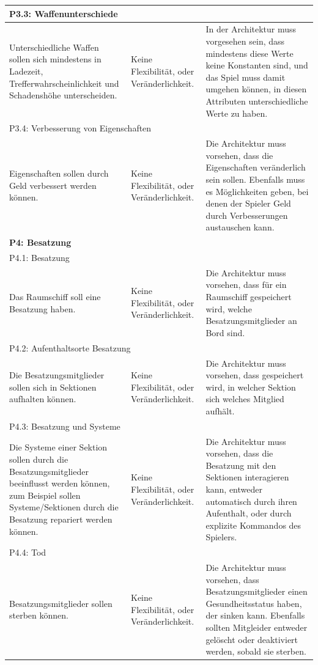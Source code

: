 \documentclass[fontsize=12pt,paper=a4,twoside]{scrartcl}
\begin{document}
\begin{longtable}[c]{|p{5cm}|p{5cm}|p{5cm}|}
\\ \hline
\multicolumn{3}{|l|}{{P3.3: Waffenunterschiede}} 
\\ \hline
Unterschiedliche Waffen sollen sich mindestens in Ladezeit, Trefferwahrscheinlichkeit und Schadenshöhe unterscheiden. & Keine Flexibilität, oder Veränderlichkeit.    &  In der Architektur muss vorgesehen sein, dass mindestens diese Werte keine Konstanten sind, und das Spiel muss damit umgehen können, in diesen Attributen unterschiedliche Werte zu haben. 
\\ \hline
\multicolumn{3}{|l|}{{P3.4: Verbesserung von Eigenschaften}} 
\\ \hline
Eigenschaften sollen durch Geld verbessert werden können. & Keine Flexibilität, oder Veränderlichkeit.    & Die Architektur muss vorsehen, dass die Eigenschaften veränderlich sein sollen. Ebenfalls muss es Möglichkeiten geben, bei denen der Spieler Geld durch Verbesserungen austauschen kann.  
\\ \hline
%
\multicolumn{3}{|l|}{{\textbf{P4: Besatzung}}} 
\\ \hline
\multicolumn{3}{|l|}{{P4.1: Besatzung}} 
\\ \hline
Das Raumschiff soll eine Besatzung haben. & Keine Flexibilität, oder Veränderlichkeit.    &  Die Architektur muss vorsehen, dass für ein Raumschiff gespeichert wird, welche Besatzungsmitglieder an Bord sind. 
\\ \hline  
\multicolumn{3}{|l|}{{P4.2: Aufenthaltsorte Besatzung}} 
\\ \hline
Die Besatzungsmitglieder sollen sich in Sektionen aufhalten können. & Keine Flexibilität, oder Veränderlichkeit.    &  Die Architektur muss vorsehen, dass gespeichert wird, in welcher Sektion sich welches Mitglied aufhält. 
\\ \hline                                                  
\multicolumn{3}{|l|}{{P4.3: Besatzung und Systeme}} 
\\ \hline
Die Systeme einer Sektion sollen durch die Besatzungsmitglieder beeinflusst werden können, zum Beispiel sollen Systeme/Sektionen durch die Besatzung repariert werden können. & Keine Flexibilität, oder Veränderlichkeit.    &  Die Architektur muss vorsehen, dass die Besatzung mit den Sektionen interagieren kann, entweder automatisch durch ihren Aufenthalt, oder durch explizite Kommandos des Spielers. 
\\ \hline
\multicolumn{3}{|l|}{{P4.4: Tod}} 
\\ \hline
Besatzungsmitglieder sollen sterben können. & Keine Flexibilität, oder Veränderlichkeit.    & Die Architektur muss vorsehen, dass Besatzungsmitglieder einen Gesundheitsstatus haben, der sinken kann. Ebenfalls sollten Mitgleider entweder gelöscht oder deaktiviert werden, sobald sie sterben. 

\end{longtable}
\end{document}
